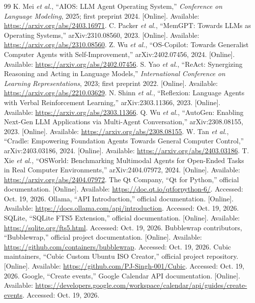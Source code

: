 \begin{thebibliography}{99}
 K. Mei \emph{et al.}, ``AIOS: LLM Agent Operating System,'' \emph{Conference on Language Modeling}, 2025; first preprint 2024. [Online]. Available: \url{https://arxiv.org/abs/2403.16971}.
 C. Packer \emph{et al.}, ``MemGPT: Towards LLMs as Operating Systems,'' arXiv:2310.08560, 2023. [Online]. Available: \url{https://arxiv.org/abs/2310.08560}.
 Z. Wu \emph{et al.}, ``OS-Copilot: Towards Generalist Computer Agents with Self-Improvement,'' arXiv:2402.07456, 2024. [Online]. Available: \url{https://arxiv.org/abs/2402.07456}.
 S. Yao \emph{et al.}, ``ReAct: Synergizing Reasoning and Acting in Language Models,'' \emph{International Conference on Learning Representations}, 2023; first preprint 2022. [Online]. Available: \url{https://arxiv.org/abs/2210.03629}.
 N. Shinn \emph{et al.}, ``Reflexion: Language Agents with Verbal Reinforcement Learning,'' arXiv:2303.11366, 2023. [Online]. Available: \url{https://arxiv.org/abs/2303.11366}.
 Q. Wu \emph{et al.}, ``AutoGen: Enabling Next-Gen LLM Applications via Multi-Agent Conversation,'' arXiv:2308.08155, 2023. [Online]. Available: \url{https://arxiv.org/abs/2308.08155}.
 W. Tan \emph{et al.}, ``Cradle: Empowering Foundation Agents Towards General Computer Control,'' arXiv:2403.03186, 2024. [Online]. Available: \url{https://arxiv.org/abs/2403.03186}.
 T. Xie \emph{et al.}, ``OSWorld: Benchmarking Multimodal Agents for Open-Ended Tasks in Real Computer Environments,'' arXiv:2404.07972, 2024. [Online]. Available: \url{https://arxiv.org/abs/2404.07972}.
 The Qt Company, ``Qt for Python,'' official documentation. [Online]. Available: \url{https://doc.qt.io/qtforpython-6/}. Accessed: Oct. 19, 2026.
 Ollama, ``API Introduction,'' official documentation. [Online]. Available: \url{https://docs.ollama.com/api/introduction}. Accessed: Oct. 19, 2026.
 SQLite, ``SQLite FTS5 Extension,'' official documentation. [Online]. Available: \url{https://sqlite.org/fts5.html}. Accessed: Oct. 19, 2026.
 Bubblewrap contributors, ``Bubblewrap,'' official project documentation. [Online]. Available: \url{https://github.com/containers/bubblewrap}. Accessed: Oct. 19, 2026.
 Cubic maintainers, ``Cubic Custom Ubuntu ISO Creator,'' official project repository. [Online]. Available: \url{https://github.com/PJ-Singh-001/Cubic}. Accessed: Oct. 19, 2026.
 Google, ``Create events,'' Google Calendar API documentation. [Online]. Available: \url{https://developers.google.com/workspace/calendar/api/guides/create-events}. Accessed: Oct. 19, 2026.

\end{thebibliography}
